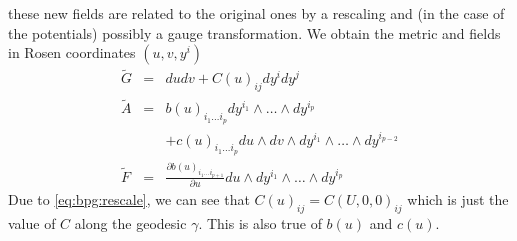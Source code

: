 \documentclass[11pt, a4paper, titlepage]{article}
\begin{document}
these new fields are related to the original ones by a rescaling and (in the
case of the potentials) possibly a gauge transformation. We obtain the metric
and fields in Rosen \cite{rosen} coordinates $(u,v,y^i)$
\begin{eqnarray}
  \label{eq:bpg:target:G}
  \widetilde{G}&=& dudv + C(u)_{ij}dy^i dy^j \\
  \label{eq:bpg:target:A}
  \widetilde{A}&=& b(u)_{i_1\ldots i_p}dy^{i_1}
  \wedge\ldots\wedge dy^{i_p} \\ \nonumber
  &&+c(u)_{i_1\ldots i_p} du\wedge
  dv\wedge dy^{i_1}\wedge\ldots\wedge dy^{i_{p-2}}\\
  \label{eq:bpg:target:F}
  \widetilde{F}&=&\frac{\partial b(u)_{i_1\ldots i_{p+1}}}{\partial u}
  du\wedge dy^{i_1}\wedge\ldots\wedge dy^{i_p}
\end{eqnarray}
Due to \eqref{eq:bpg:rescale}, we can see that $C(u)_{ij}=C(U,0,0)_{ij}$ which
is just the value of $C$ along the geodesic $\gamma$. This is also true of
$b(u)$ and $c(u)$.
\end{document}
